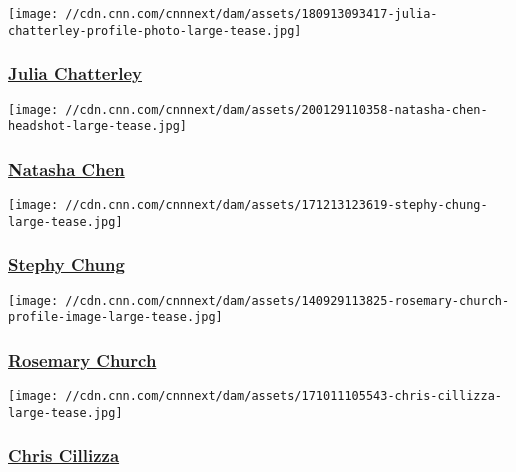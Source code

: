 \href{/profiles/julia-chatterley-profile}{}

\texttt{[image: //cdn.cnn.com/cnnnext/dam/assets/180913093417-julia-chatterley-profile-photo-large-tease.jpg]}

\hypertarget{julia-chatterley}{%
\subsubsection{\texorpdfstring{\href{/profiles/julia-chatterley-profile}{Julia
Chatterley}}{Julia Chatterley}}\label{julia-chatterley}}

\href{/profiles/natasha-chen}{}

\texttt{[image: //cdn.cnn.com/cnnnext/dam/assets/200129110358-natasha-chen-headshot-large-tease.jpg]}

\hypertarget{natasha-chen}{%
\subsubsection{\texorpdfstring{\href{/profiles/natasha-chen}{Natasha
Chen}}{Natasha Chen}}\label{natasha-chen}}

\href{/profiles/stephy-chung}{}

\texttt{[image: //cdn.cnn.com/cnnnext/dam/assets/171213123619-stephy-chung-large-tease.jpg]}

\hypertarget{stephy-chung-}{%
\subsubsection{\texorpdfstring{\href{/profiles/stephy-chung}{Stephy
Chung }}{Stephy Chung }}\label{stephy-chung-}}

\href{/profiles/rosemary-church-profile}{}

\texttt{[image: //cdn.cnn.com/cnnnext/dam/assets/140929113825-rosemary-church-profile-image-large-tease.jpg]}

\hypertarget{rosemary-church}{%
\subsubsection{\texorpdfstring{\href{/profiles/rosemary-church-profile}{Rosemary
Church}}{Rosemary Church}}\label{rosemary-church}}

\href{/profiles/chris-cillizza}{}

\texttt{[image: //cdn.cnn.com/cnnnext/dam/assets/171011105543-chris-cillizza-large-tease.jpg]}

\hypertarget{chris-cillizza}{%
\subsubsection{\texorpdfstring{\href{/profiles/chris-cillizza}{Chris
Cillizza}}{Chris Cillizza}}\label{chris-cillizza}}

